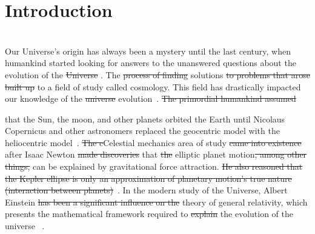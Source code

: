 \chapter{Introduction}

 \\

Our Universe's origin has always been a mystery until the last century, when humankind started looking for  answers to the unanswered questions about the evolution of the \st{Universe} . The \st{process of finding}  solutions \st{to problems that arose built up}  to a field of study called cosmology. This field has drastically impacted our knowledge of the \st{universe}  evolution~\citep{book:909085}. \st{The primordial humankind assumed}

  that the Sun, the moon, and other planets orbited the Earth until Nicolaus Copernicus and other astronomers replaced the geocentric model with the heliocentric model~\citep{sep-copernicus, kanas}. \st{The c}{\attention C}elestial mechanics  area of study \st{came into existence} after Isaac Newton \st{made discoveries}  that \st{the} elliptic planet motion\st{, among other things,} can be explained by gravitational force attraction. \st{He also reasoned that the Kepler ellipse is only an approximation of planetary motion's true nature (interaction between planets)}~\citep{crowe2013theories,sep-copernicus}.  In the modern study of the Universe,  Albert Einstein \st{has been a significant influence on the} theory of general relativity, which presents the mathematical framework required to \st{explain}  the evolution of the universe ~\citep{1965ApJ...142..419P}.  
	
